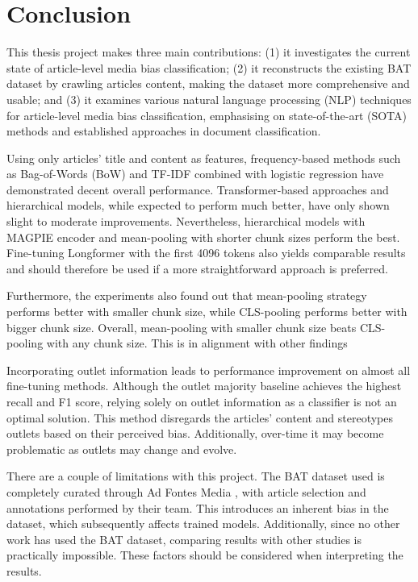 \chapter{Conclusion}
\label{cha:6}

This thesis project makes three main contributions: (1) it investigates the current state of article-level media bias classification; (2) it reconstructs the existing BAT dataset by crawling articles content, making the dataset more comprehensive and usable; and (3) it examines various natural language processing (NLP) techniques for article-level media bias classification, emphasising on state-of-the-art (SOTA) methods and established approaches in document classification.

Using only articles' title and content as features, frequency-based methods such as Bag-of-Words (BoW) and TF-IDF combined with logistic regression have demonstrated decent overall performance. Transformer-based approaches and hierarchical models, while expected to perform much better, have only shown slight to moderate improvements. Nevertheless, hierarchical models with MAGPIE encoder and mean-pooling with shorter chunk sizes perform the best. Fine-tuning Longformer with the first 4096 tokens also yields comparable results and should therefore be used if a more straightforward approach is preferred.

Furthermore, the experiments also found out that mean-pooling strategy performs better with smaller chunk size, while CLS-pooling performs better with bigger chunk size. Overall, mean-pooling with smaller chunk size beats CLS-pooling with any chunk size. This is in alignment with other findings \cite{rodrigo-2024-systematic-review-media-bias,reimers-2019-sentencebert}

Incorporating outlet information leads to performance improvement on almost all fine-tuning methods. Although the outlet majority baseline achieves the highest recall and F1 score, relying solely on outlet information as a classifier is not an optimal solution. This method disregards the articles' content and stereotypes outlets based on their perceived bias. Additionally, over-time it may become problematic as outlets may change and evolve.

There are a couple of limitations with this project. The BAT dataset used is completely curated through Ad Fontes Media \cite{adfontes}, with article selection and annotations performed by their team. This introduces an inherent bias in the dataset, which subsequently affects trained models. Additionally, since no other work has used the BAT dataset, comparing results with other studies is practically impossible. These factors should be considered when interpreting the results.

